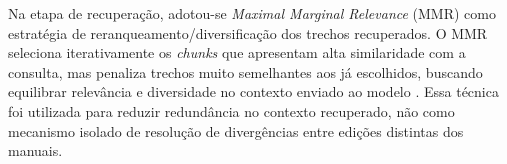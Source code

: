 Na etapa de recuperação, adotou-se \textit{Maximal Marginal Relevance} (MMR) como estratégia de reranqueamento/diversificação dos trechos recuperados.
O MMR seleciona iterativamente os \textit{chunks} que apresentam alta similaridade com a consulta, mas penaliza trechos muito semelhantes aos já escolhidos, buscando equilibrar relevância e diversidade no contexto enviado ao modelo \cite{CarbonellGoldstein1998MMR}.
Essa técnica foi utilizada para reduzir redundância no contexto recuperado, não como mecanismo isolado de resolução de divergências entre edições distintas dos manuais.


